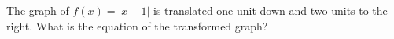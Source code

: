 The graph of $f(x)=|x-1|$ is translated one unit down and two units to the right. What is the equation of the transformed graph?
